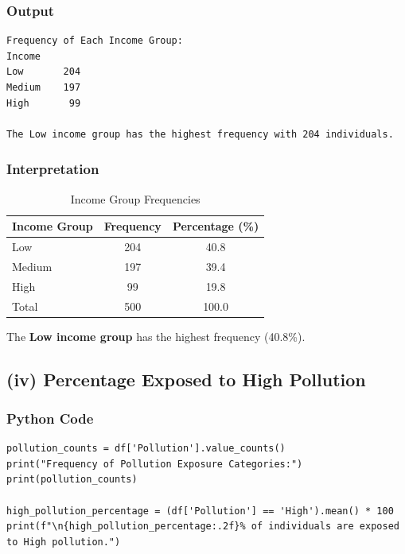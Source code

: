 \documentclass[12pt,a4paper]{article}
\begin{document}
\subsubsection{Output}

\begin{lstlisting}[style=outputstyle]
Frequency of Each Income Group:
Income
Low       204
Medium    197
High       99

The Low income group has the highest frequency with 204 individuals.
\end{lstlisting}

\subsubsection{Interpretation}

\begin{table}[H]
  \centering
  \caption{Income Group Frequencies}
  \begin{tabular}{lcc}
    \toprule
    \textbf{Income Group} & \textbf{Frequency} & \textbf{Percentage (\%)} \\
    \midrule
    Low    & 204 & 40.8 \\
    Medium & 197 & 39.4 \\
    High   &  99 & 19.8 \\
    \midrule
    Total  & 500 & 100.0 \\
    \bottomrule
  \end{tabular}
\end{table}

The \textbf{Low income group} has the highest frequency (40.8\%).

\subsection{(iv) Percentage Exposed to High Pollution}

\subsubsection{Python Code}

\begin{lstlisting}[style=pythonstyle, caption={Pollution exposure analysis}]
pollution_counts = df['Pollution'].value_counts()
print("Frequency of Pollution Exposure Categories:")
print(pollution_counts)

high_pollution_percentage = (df['Pollution'] == 'High').mean() * 100
print(f"\n{high_pollution_percentage:.2f}% of individuals are exposed to High pollution.")
\end{lstlisting}
\end{document}
